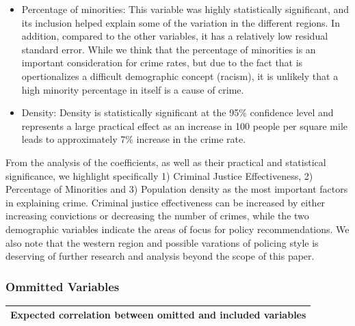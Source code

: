 \documentclass[]{article}
\begin{document}
\begin{itemize}
\item
  Percentage of minorities: This variable was highly statistically
  significant, and its inclusion helped explain some of the variation in
  the different regions. In addition, compared to the other variables,
  it has a relatively low residual standard error. While we think that
  the percentage of minorities is an important consideration for crime
  rates, but due to the fact that is opertionalizes a difficult
  demographic concept (racism), it is unlikely that a high minority
  percentage in itself is a cause of crime.\\
\item
  Density: Density is statistically significant at the 95\% confidence
  level and represents a large practical effect as an increase in 100
  people per square mile leads to approximately 7\% increase in the
  crime rate.
\end{itemize}

From the analysis of the coefficients, as well as their practical and
statistical significance, we highlight specifically 1) Criminal Justice
Effectiveness, 2) Percentage of Minorities and 3) Population density as
the most important factors in explaining crime. Criminal justice
effectiveness can be increased by either increasing convictions or
decreasing the number of crimes, while the two demographic variables
indicate the areas of focus for policy recommendations. We also note
that the western region and possible varations of policing style is
deserving of further research and analysis beyond the scope of this
paper.

\hypertarget{ommitted-variables}{%
\subsubsection{Ommitted Variables}\label{ommitted-variables}}

\begin{longtable}[]{@{}l@{}}
\toprule
Expected correlation between omitted and included
variables\tabularnewline
\midrule
\endhead
\bottomrule
\end{longtable}
\end{document}
